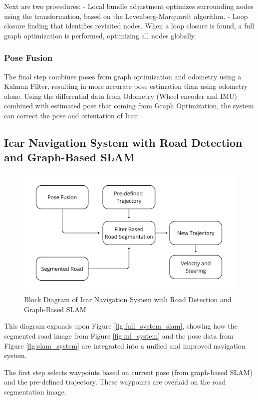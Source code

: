 \documentclass[conference]{IEEEtran}
\begin{document}
Next are two procedures:
- Local bundle adjustment optimizes surrounding nodes using the transformation, based on the Levenberg-Marquardt algorithm.
- Loop closure finding that identifies revisited nodes. When a loop closure is found, a full graph optimization is performed, optimizing all nodes globally. 

\subsubsection{Pose Fusion} 
The final step combines poses from graph optimization and odometry using a Kalman Filter, resulting in more accurate pose estimation than using odometry alone. Using the differential data from Odometry (Wheel encoder and IMU) combined with estimated pose that coming from Graph Optimization, the system can correct the pose and orientation of Icar.

\subsection{Icar Navigation System with Road Detection and Graph-Based SLAM} 
\begin{figure}[H]
	\centering
	\includegraphics[width=\linewidth]{../konten/nav_new_sys3.png}
	\caption{Block Diagram of Icar Navigation System with Road Detection and Graph-Based SLAM}
	\label{fig:nav_new_system}
\end{figure} 

This diagram expands upon Figure \ref{fig:full_system_slam}, showing how the segmented road image from Figure \ref{fig:ml_system} and the pose data from Figure \ref{fig:slam_system} are integrated into a unified and improved navigation system.

\par  
The first step selects waypoints based on current pose (from graph-based SLAM) and the pre-defined trajectory. These waypoints are overlaid on the road segmentation image.
\end{document}
